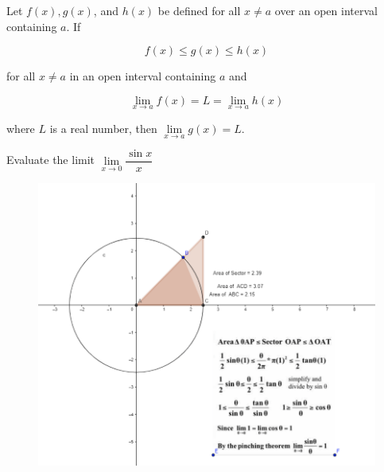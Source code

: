 \begin{theorem}
  Let \(f(x),g(x)\), and \(h(x)\) be defined for all \(x\neq a\) over an open
  interval containing \(a\). If
  
  \[f(x)\le g(x)\le h(x)\]
  
  for all \(x\neq a\) in an open interval containing \(a\) and
  
  \[\lim\limits_{x\to a}f(x)=L=\lim\limits_{x\to a}h(x)\]
  
  where \(L\) is a real number, then \(\lim\limits_{x\to a}g(x)=L.\)
\end{theorem}


\begin{example}
  Evaluate the limit
  \(\lim\limits_{x\to 0}\dfrac{\sin x}{x}\)
  
\begin{fullwidth}
  \begin{figure}[h!]
  \centering
  \includegraphics[width=0.8\linewidth]{img/image-20200830170927969.png}
  \end{figure}
\end{fullwidth}
\end{example}
\vspace*{6\baselineskip}

